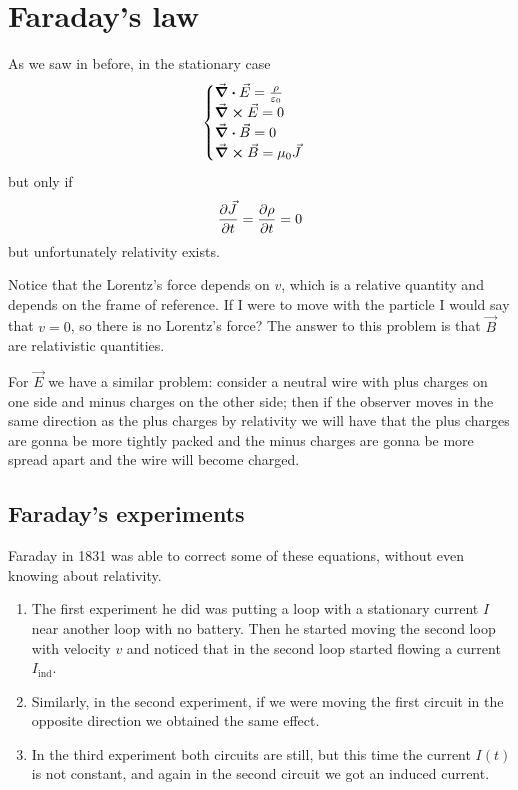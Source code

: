 \documentclass[12pt]{extarticle}
\begin{document}
\section{Faraday's law}
As we saw in before, in the stationary case
\begin{equation}
	\begin{cases}
		\div \vec E = \frac{\rho}{\varepsilon_0} \\
		\curl \vec E = 0                         \\
		\div \vec B = 0                          \\
		\curl \vec B = \mu_0 \vec J
	\end{cases}
\end{equation}
but only if
\begin{equation}
	\pdv{\vec J}{t} = \pdv{\rho}{t} = 0
\end{equation}
but unfortunately relativity exists.

Notice that the Lorentz's force depends on $v$, which is a relative quantity
and depends on the frame of reference.
If I were to move with the particle I would say that $v = 0$, so there is no Lorentz's force?
The answer to this problem is that $\vec B$ are relativistic quantities.

For $\vec E$ we have a similar problem:
consider a neutral wire with plus charges on one side and minus charges on the other side;
then if the observer moves in the same direction as the plus charges by relativity we will have that
the plus charges are gonna be more tightly packed and the minus charges are gonna be more spread apart
and the wire will become charged.

\subsection{Faraday's experiments}

Faraday in 1831 was able to correct some of these equations, without even knowing about relativity.

\begin{enumerate}
	\item
	      The first experiment he did was putting a loop with a stationary current $I$ near another loop
	      with no battery.
	      Then he started moving the second loop with velocity $v$ and noticed that in the second loop started flowing
	      a current $I_\text{ind}$.

	\item
	      Similarly, in the second experiment,
	      if we were moving the first circuit in the opposite direction we obtained the same effect.

	\item
	      In the third experiment both circuits are still, but this time the current $I(t)$ is not constant,
	      and again in the second circuit we got an induced current.
\end{enumerate}
\end{document}
